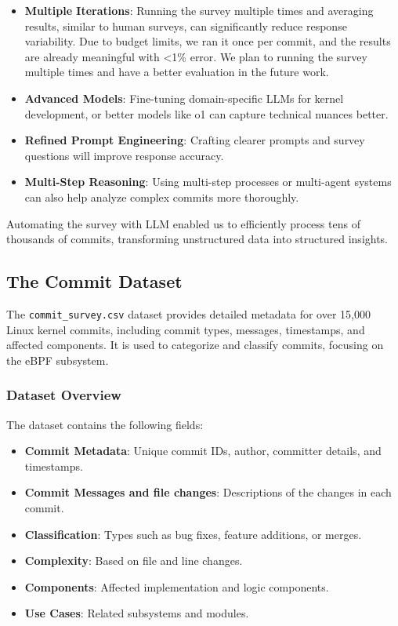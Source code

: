 \begin{itemize} 
\item \textbf{Multiple Iterations}: Running the survey multiple times and averaging results, similar to human surveys, can significantly reduce response variability. Due to budget limits, we ran it once per commit, and the results are already meaningful with <1\% error. We plan to running the survey multiple times and have a better evaluation in the future work.
\item \textbf{Advanced Models}: Fine-tuning domain-specific LLMs for kernel development, or better models like o1\cite{o1} can capture technical nuances better. 
\item \textbf{Refined Prompt Engineering}: Crafting clearer prompts and survey questions will improve response accuracy. 
\item \textbf{Multi-Step Reasoning}: Using multi-step processes or multi-agent systems can also help analyze complex commits more thoroughly. 
\end{itemize}

Automating the survey with LLM enabled us to efficiently process tens of thousands of commits, transforming unstructured data into structured insights.

\subsection{The Commit Dataset}

The \texttt{commit\_survey.csv} dataset provides detailed metadata for over 15,000 Linux kernel commits, including commit types, messages, timestamps, and affected components. It is used to categorize and classify commits, focusing on the eBPF subsystem.

\subsubsection{Dataset Overview}
The dataset contains the following fields:
\begin{itemize}
    \item \textbf{Commit Metadata}: Unique commit IDs, author, committer details, and timestamps.
    \item \textbf{Commit Messages and file changes}: Descriptions of the changes in each commit.
    \item \textbf{Classification}: Types such as bug fixes, feature additions, or merges.
    \item \textbf{Complexity}: Based on file and line changes.
    \item \textbf{Components}: Affected implementation and logic components.
    \item \textbf{Use Cases}: Related subsystems and modules.
\end{itemize}

